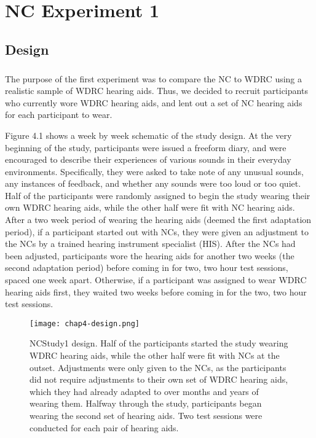 \chapter{NC Experiment 1}

\section{Design}
\paragraph{}The purpose of the first experiment was to compare the NC to WDRC using a realistic sample of WDRC hearing aids.  Thus, we decided to recruit participants who currently wore WDRC hearing aids, and lent out a set of NC hearing aids for each participant to wear.

Figure 4.1 shows a week by week schematic of the study design.  At the very beginning of the study, participants were issued a freeform diary, and were encouraged to describe their experiences of various sounds in their everyday environments.  Specifically, they were asked to take note of any unusual sounds, any instances of feedback, and whether any sounds were too loud or too quiet.  Half of the participants were randomly assigned to begin the study wearing their own WDRC hearing aids, while the other half were fit with NC hearing aids.  After a two week period of wearing the hearing aids (deemed the first adaptation period), if a participant started out with NCs, they were given an adjustment to the NCs by a trained hearing instrument specialist (HIS).  After the NCs had been adjusted, participants wore the hearing aids for another two weeks (the second adaptation period) before coming in for two, two hour test sessions, spaced one week apart.  Otherwise, if a participant was assigned to wear WDRC hearing aids first, they waited two weeks before coming in for the two, two hour test sessions.

\begin{figure}[htp]
\begin{center}
\texttt{[image: chap4-design.png]}\\
\caption[NCStudy1 design]{NCStudy1 design.  Half of the participants started the study wearing WDRC hearing aids, while the other half were fit with NCs at the outset.  Adjustments were only given to the NCs, as the participants did not require adjustments to their own set of WDRC hearing aids, which they had already adapted to over months and years of wearing them.  Halfway through the study, participants began wearing the second set of hearing aids.  Two test sessions were conducted for each pair of hearing aids.}
\label{ch4-design}
\end{center}
\end{figure}

